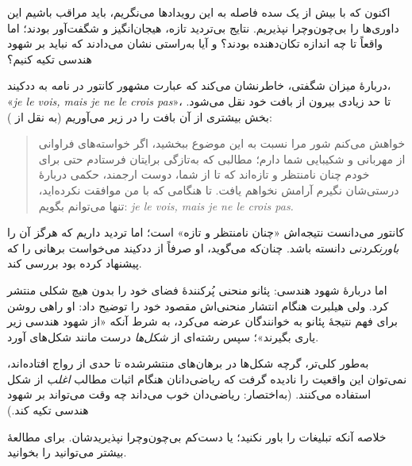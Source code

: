 \documentclass[../../../include/open-logic-section]{subfiles}
\begin{document}


اکنون که با بیش از یک سده فاصله به این رویدادها می‌نگریم، باید مراقب
باشیم این داوری‌ها را بی‌چون‌وچرا نپذیریم. نتایج بی‌تردید تازه، هیجان‌انگیز
و شگفت‌آور بودند؛ اما واقعاً تا چه اندازه تکان‌دهنده بودند؟ و آیا به‌راستی
نشان می‌دادند که نباید بر شهود هندسی تکیه کنیم؟

دربارهٔ میزان شگفتی، \citet{Gouvea2011} خاطرنشان می‌کند که عبارت مشهور
کانتور در نامه به ددکیند، «\emph{je le vois, mais je ne le crois pas}»،
تا حد زیادی بیرون از بافت خود نقل می‌شود. بخش بیشتری از آن بافت را در زیر
می‌آوریم (به نقل از \citeauthor{Gouvea2011}):
\begin{quote}
خواهش می‌کنم شور مرا نسبت به این موضوع ببخشید، اگر خواسته‌های فراوانی از
مهربانی و شکیبایی شما دارم؛ مطالبی که به‌تازگی برایتان فرستادم حتی برای
خودم چنان نامنتظر و تازه‌اند که تا از شما، دوست ارجمند، حکمی دربارهٔ
درستی‌شان نگیرم آرامش نخواهم یافت. تا هنگامی که با من موافقت نکرده‌اید،
تنها می‌توانم بگویم: \emph{je le vois, mais je ne le crois pas.}
\end{quote}
کانتور می‌دانست نتیجه‌اش «چنان نامنتظر و تازه» است؛ اما تردید داریم که
هرگز آن را \emph{باورنکردنی} دانسته باشد. چنان‌که
\citeauthor{Gouvea2011} می‌گوید، او صرفاً از ددکیند می‌خواست برهانی را که
پیشنهاد کرده بود بررسی کند.

اما دربارهٔ شهود هندسی: پئانو منحنی پُرکنندهٔ فضای خود را بدون هیچ شکلی
منتشر کرد. ولی هیلبرت هنگام انتشار منحنی‌اش مقصود خود را توضیح داد: او
راهی روشن برای فهم نتیجهٔ پئانو به خوانندگان عرضه می‌کرد، به شرط آنکه
«از شهود هندسی زیر یاری بگیرند»؛ سپس رشته‌ای از \emph{شکل‌ها} درست مانند
شکل‌های  آورد.

به‌طور کلی‌تر، گرچه شکل‌ها در برهان‌های منتشرشده تا حدی از رواج افتاده‌اند،
نمی‌توان این واقعیت را نادیده گرفت که ریاضی‌دانان هنگام اثبات مطالب
\emph{اغلب} از شکل استفاده می‌کنند. (به‌اختصار: ریاضی‌دان خوب می‌داند چه
وقت می‌تواند بر شهود هندسی تکیه کند.)

خلاصه آنکه تبلیغات را باور نکنید؛ یا دست‌کم بی‌چون‌وچرا نپذیریدشان. برای
مطالعهٔ بیشتر می‌توانید \citet{Giaquinto2007} را بخوانید.
\end{document}
